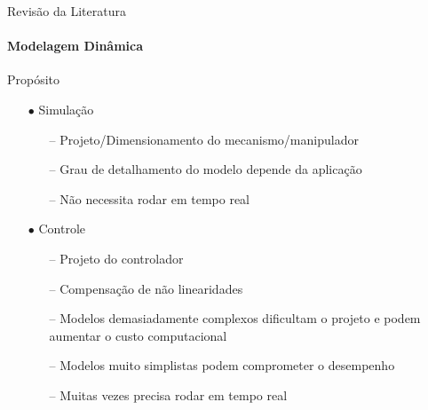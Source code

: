 \documentclass[25pt,landscape]{beamer}
\begin{document}
\begin{frame}{Revisão da Literatura}
    \framesubtitle{Modelagem Dinâmica}
        \begin{block}{Propósito}
    	\begin{itemize}
    		\pause
    		\item[$\bullet$] Simulação
    		\begin{itemize}
    			\pause
    			\item[--] Projeto/Dimensionamento do mecanismo/manipulador \\[4pt]
    			\item[--] Grau de detalhamento do modelo depende da aplicação \\[4pt]
    			\item[--] Não necessita rodar em tempo real \\[4pt]
    		\end{itemize}
    		\pause
    		\item[$\bullet$] Controle
    		\begin{itemize}
    			\pause
    			\item[--] Projeto do controlador \\[4pt]
    			\item[--] Compensação de não linearidades \\[4pt]
    			\item[--] Modelos demasiadamente complexos dificultam o projeto e podem aumentar o custo computacional \\[4pt]
    			\item[--] Modelos muito simplistas podem comprometer o desempenho \\[4pt]
    			\item[--] Muitas vezes precisa rodar em tempo real \\[4pt]
    		\end{itemize}
    	\end{itemize}
    \end{block}
\end{frame}
\end{document}
